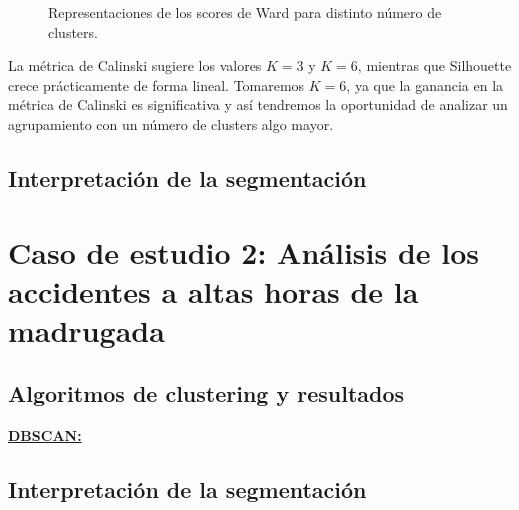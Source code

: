 \documentclass[oneside]{book}
\begin{document}
\begin{figure}[H]
  \centering
  \caption{Representaciones de los scores de Ward para distinto número de clusters.}
  \label{fig:ward1-scores}
\end{figure}

La métrica de Calinski sugiere los valores $K=3$ y $K=6$, mientras que
Silhouette crece prácticamente de forma lineal. Tomaremos $K=6$, ya
que la ganancia en la métrica de Calinski es significativa y así
tendremos la oportunidad de analizar un agrupamiento con un número de
clusters algo mayor.

\subsection{Interpretación de la
  segmentación} \label{sec:interpretacion1}

\section{Caso de estudio 2: Análisis de los accidentes a altas horas de la madrugada}

\subsection{Algoritmos de clustering y resultados}

\href{https://scikit-learn.org/stable/modules/generated/sklearn.cluster.DBSCAN.html}{\textbf{DBSCAN:}}

\subsection{Interpretación de la segmentación}
\end{document}
